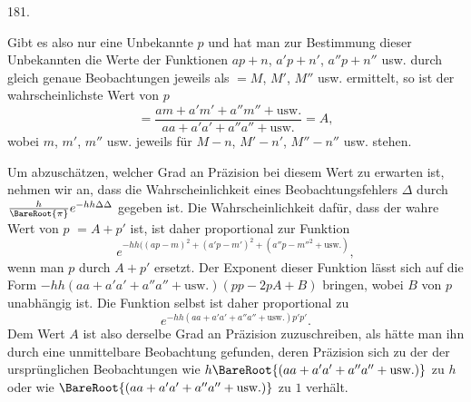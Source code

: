\begin{center}\hypertarget{native-254-article181}{}181.\end{center}
Gibt es also nur eine Unbekannte $p$ und hat man zur Bestimmung dieser Unbekannten die Werte der Funktionen $ap+n$, $a'p+n'$, $a''p+n''$ usw. durch gleich genaue Beobachtungen jeweils als $=M$, $M'$, $M''$ usw. ermittelt, so ist der wahrscheinlichste Wert von $p$
\[
=\frac{am+a'm'+a''m''+\text{usw.}}{aa+a'a'+a''a''+\text{usw.}}=A,
\]
wobei $m$, $m'$, $m''$ usw. jeweils für $M-n$, $M'-n'$, $M''-n''$ usw. stehen.

Um abzuschätzen, welcher Grad an Präzision bei diesem Wert zu erwarten ist, nehmen wir an, dass die Wahrscheinlichkeit eines Beobachtungsfehlers $\Delta$ durch $\frac{h}{\BareRoot{\pi}}e^{-hh\Delta\Delta}$ gegeben ist. Die Wahrscheinlichkeit dafür, dass der wahre Wert von $p$ $=A+p'$ ist, ist daher proportional zur Funktion
\[
e^{-hh((ap-m)^2+(a'p-m')^2+(a''p-m''^2+\text{usw.})},
\]
wenn man $p$ durch $A+p'$ ersetzt. Der Exponent dieser Funktion lässt sich auf die Form $-hh(aa+a'a'+a''a''+\text{usw.})(pp-2pA+B)$ bringen, wobei $B$ von $p$ unabhängig ist. Die Funktion selbst ist daher proportional zu
\[
e^{-hh(aa+a'a'+a''a''+\text{usw.})p'p'}.
\]
Dem Wert $A$ ist also derselbe Grad an Präzision zuzuschreiben, als hätte man ihn durch eine unmittelbare Beobachtung gefunden, deren Präzision sich zu der der ursprünglichen Beobachtungen wie $h\BareRoot{(aa+a'a'+a''a''+\text{usw.})}$ zu $h$ oder wie $\BareRoot{(aa+a'a'+a''a''+\text{usw.})}$ zu $1$ verhält.
